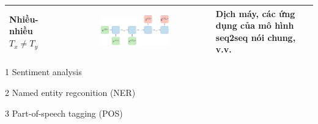 \begin{table}[htb!]
\begin{threeparttable}
\begin{tabularx}{\textwidth}{ L{0.9} c L{1} }
            Nhiều-nhiều $T_x\neq T_y$ & \includegraphics[width=0.47\textwidth, valign=t]{image/rnn-many-to-many-different-ltr.png} & Dịch máy, các ứng dụng của mô hình seq2seq nói chung, v.v.            \\
            \bottomrule
        \end{tabularx}
        \begin{tablenotes}
            \item[1] Sentiment analysis
            \item[2] Named entity regconition (NER)
            \item[3] Part-of-speech tagging (POS)
        \end{tablenotes}
    \end{threeparttable}
\end{table}

